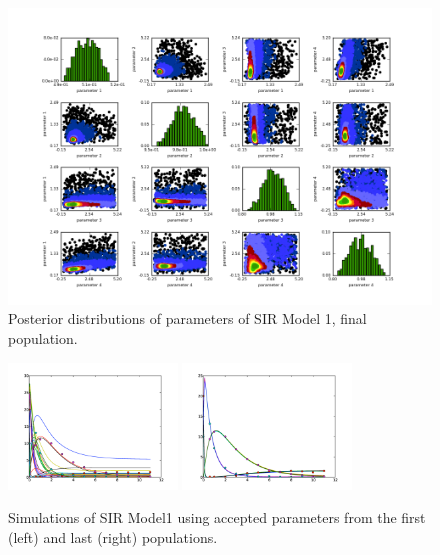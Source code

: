 \documentclass[a4paper]{report}
\begin{document}
\begin{figure}[htbp]
\begin{center}
\includegraphics[width=1.0\textwidth]{Graphics/AcceptedSIR.png}
\caption{Posterior distributions of parameters of SIR Model 1, final population. \label{AcceptedSIR}}
\end{center}
\end{figure}
\begin{figure}[htbp]
\begin{center}
\includegraphics[width=0.4\textwidth]{Graphics/FirstTimeSIR.png}
\hspace{0.5cm}
\includegraphics[width=0.4\textwidth]{Graphics/LastTimeSIR.png} 
\caption{Simulations of SIR Model1 using accepted parameters from the first (left) and last (right) populations. \label{TimeseriesSIR}}
\end{center}
\end{figure} 
\end{document}
